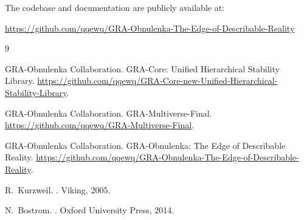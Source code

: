 \documentclass[11pt,a4paper]{article}
\begin{document}
The codebase and documentation are publicly available at:
\begin{center}
\url{https://github.com/qqewq/GRA-Obnulenka-The-Edge-of-Describable-Reality}
\end{center}

\begin{thebibliography}{9}

GRA-Obnulenka Collaboration.
\newblock GRA-Core: Unified Hierarchical Stability Library.
\newblock \url{https://github.com/qqewq/GRA-Core-new-Unified-Hierarchical-Stability-Library}.

GRA-Obnulenka Collaboration.
\newblock GRA-Multiverse-Final.
\newblock \url{https://github.com/qqewq/GRA-Multiverse-Final}.

GRA-Obnulenka Collaboration.
\newblock GRA-Obnulenka: The Edge of Describable Reality.
\newblock \url{https://github.com/qqewq/GRA-Obnulenka-The-Edge-of-Describable-Reality}.

R.~Kurzweil.
.
\newblock Viking, 2005.

N.~Bostrom.
.
\newblock Oxford University Press, 2014.

\end{thebibliography}
\end{document}
